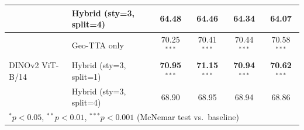 \begin{table}[htbp]
{\begin{tabular}{llcccc}
 & Hybrid (sty=3, split=4) & 64.48 & 64.46 & 64.34 & 64.07 \\
\midrule
\multirow{3}{*}{DINOv2 ViT-B/14} & Geo-TTA only & 70.25$^{***}$ & 70.41$^{***}$ & 70.44$^{***}$ & 70.58$^{***}$ \\
 & Hybrid (sty=3, split=1) & \textbf{70.95$^{***}$} & \textbf{71.15$^{***}$} & \textbf{70.94$^{***}$} & \textbf{70.62$^{***}$} \\
 & Hybrid (sty=3, split=4) & 68.90 & 68.95 & 68.94 & 68.86 \\
\midrule
\multicolumn{6}{l}{\footnotesize $^{*}p<0.05$, $^{**}p<0.01$, $^{***}p<0.001$ (McNemar test vs.\ baseline)} \\
\bottomrule
\end{tabular}
}
\end{table}